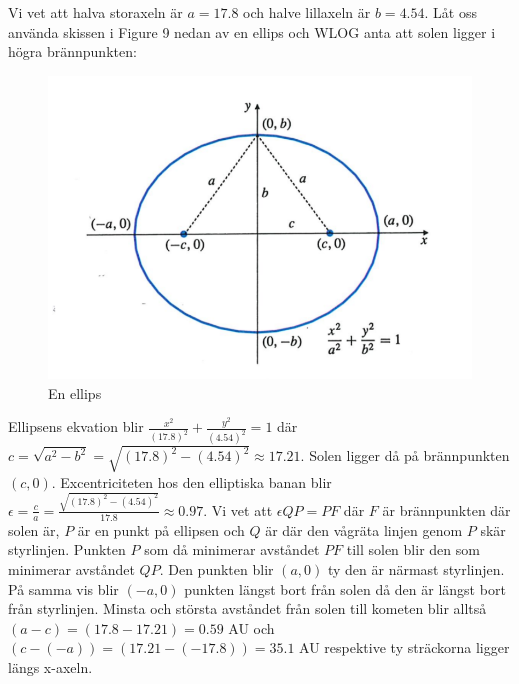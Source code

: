 \documentclass{article}
\begin{document}
Vi vet att halva storaxeln är $a=17.8$ och halve lillaxeln är $b=4.54$. Låt oss använda skissen i Figure 9 nedan av en ellips och WLOG anta att solen ligger i högra brännpunkten:

\begin{figure}[h]
    \center
    \includegraphics[scale=0.7]{./images/ellips}
    \caption{En ellips}
\end{figure}

Ellipsens ekvation blir $\frac{x^2}{(17.8)^2}+\frac{y^2}{(4.54)^2}=1$ där $c=\sqrt{a^2-b^2}=\sqrt{(17.8)^2-(4.54)^2} \approx 17.21$. Solen ligger då på brännpunkten $(c, 0)$. Excentriciteten hos den elliptiska banan blir $\epsilon=\frac{c}{a}=\frac{\sqrt{(17.8)^2-(4.54)^2}}{17.8} \approx 0.97$. Vi vet att $\epsilon QP = PF$ där $F$ är brännpunkten där solen är, $P$ är en punkt på ellipsen och $Q$ är där den vågräta linjen genom $P$ skär styrlinjen. Punkten $P$ som då minimerar avståndet $PF$ till solen blir den som minimerar avståndet $QP$. Den punkten blir $(a, 0)$ ty den är närmast styrlinjen. På samma vis blir $(-a, 0)$ punkten längst bort från solen då den är längst bort från styrlinjen. Minsta och största avståndet från solen till kometen blir alltså $(a-c)=(17.8-17.21)=0.59$ AU och $(c-(-a))=(17.21-(-17.8))=35.1$ AU respektive ty sträckorna ligger längs x-axeln.
\end{document}
